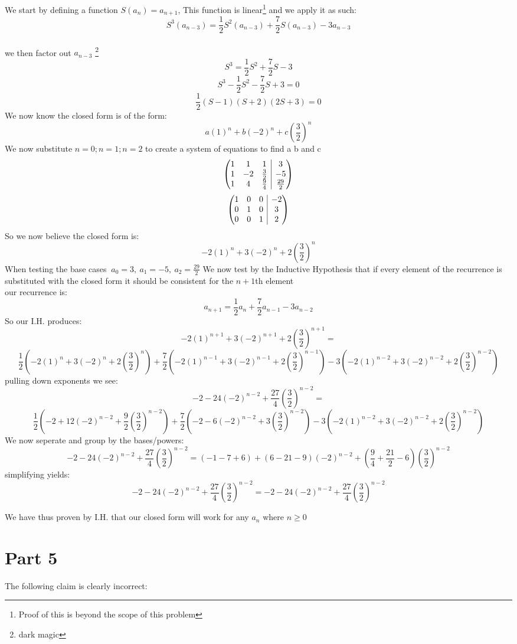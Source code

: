 \documentclass{article}
\makeatletter
\newcounter{prob}\setcounter{prob}{1}\newcommand{\prob}{\arabic{prob}.\indent \addtocounter{prob}{1}}
\newenvironment{amatrix}[1]{%
	\left(\begin{array}{@{}*{#1}{c}|c@{}}
	}{%
\end{array}\right)
}
\makeatother
\begin{document}
We start by defining a function $S(a_n) =a_{n+1}$, This function is linear\footnote{Proof of this is beyond the scope of this problem} and we apply it as such:
$$S^3(a_{n-3})= \frac{1}{2}S^2(a_{n-3})+\frac{7}{2}S(a_{n-3})-3a_{n-3}$$\\
we then factor out $a_{n-3}$ \footnote{dark magic}
$$S^3= \frac{1}{2}S^2+\frac{7}{2}S-3$$
$$S^3 -\frac{1}{2}S^2-\frac{7}{2}S+3=0$$
$$\frac{1}{2}(S-1)(S+2)(2S+3)=0$$
We now know the closed form is of the form:
$$a(1)^n+b(-2)^n+c(\frac{3}{2})^n$$
We now substitute $n=0;n=1;n=2$ to create a system of equations to find a b and c
$$\begin{amatrix}{3}
	1 & 1 & 1 & 3 \\  1 & -2 & \frac{3}{2} & -5 \\ 1 & 4 & \frac{9}{4} & \frac{29}{2} 
\end{amatrix}$$
$$\begin{amatrix}{3}
1 & 0 & 0 & -2 \\  0 & 1 & 0 & 3 \\ 0 & 0 & 1 & 2 
\end{amatrix}$$
So we now believe the closed form is:
$$-2(1)^n+3(-2)^n+2(\frac{3}{2})^n$$
When testing the base cases $\ a_0=3,\ a_1=-5,\ a_2=\frac{29}{2}$
We now test by the Inductive Hypothesis that if every element of the recurrence is substituted with the closed form it should be consistent for the $n+1$th element\\
our recurrence is:
$$a_{n+1}= \frac{1}{2}a_{n}+\frac{7}{2}a_{n-1}-3a_{n-2}$$
So our I.H. produces:
$$-2(1)^{n+1}+3(-2)^{n+1}+2(\frac{3}{2})^{n+1}=$$$$ \frac{1}{2}(-2(1)^{n}+3(-2)^{n}+2(\frac{3}{2})^{n})+\frac{7}{2}(-2(1)^{n-1}+3(-2)^{n-1}+2(\frac{3}{2})^{n-1})-3(-2(1)^{n-2}+3(-2)^{n-2}+2(\frac{3}{2})^{n-2})$$
pulling down exponents we see:
$$-2-24(-2)^{n-2}+\frac{27}{4}(\frac{3}{2})^{n-2}=$$$$ \frac{1}{2}(-2+12(-2)^{n-2}+\frac{9}{2}(\frac{3}{2})^{n-2})+\frac{7}{2}(-2-6(-2)^{n-2}+3(\frac{3}{2})^{n-2})-3(-2(1)^{n-2}+3(-2)^{n-2}+2(\frac{3}{2})^{n-2})$$
We now seperate and group by the bases/powers:
$$-2-24(-2)^{n-2}+\frac{27}{4}(\frac{3}{2})^{n-2}=(-1-7+6) +(6-21-9)(-2)^{n-2}+(\frac{9}{4}+\frac{21}{2}-6)(\frac{3}{2})^{n-2}$$
simplifying yields: 
$$-2-24(-2)^{n-2}+\frac{27}{4}(\frac{3}{2})^{n-2}=-2 -24(-2)^{n-2} +\frac{27}{4}(\frac{3}{2})^{n-2}$$

We have thus proven by I.H. that our closed form will work for any $a_n$ where $n\geq0$

\newpage
\section{Part 5}
The following claim is clearly incorrect:\\
\end{document}
